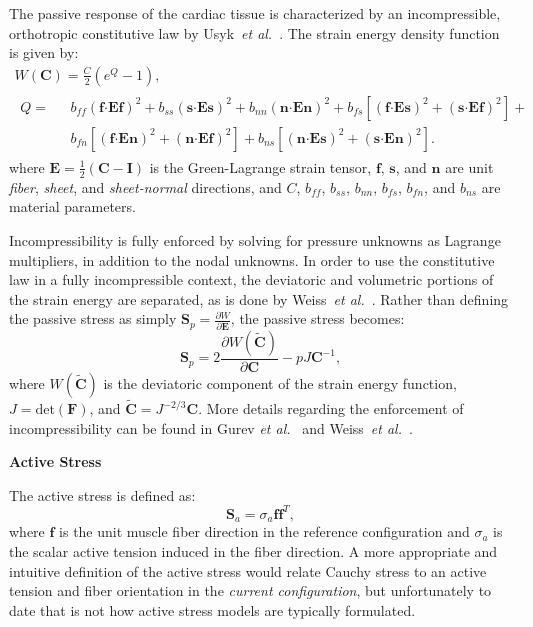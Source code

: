 The passive response of the cardiac tissue is characterized by an incompressible, orthotropic constitutive law by Usyk~\textit{et al.}~\cite{usyk_2002}. The strain energy density function is given by:
\begin{gather}
W(\bm{C}) = \frac{C}{2}\left(e^Q -1\right), \\
\begin{aligned}
Q =\text{\ } &b_{ff} \left(\bm{f}\bm{\cdot}\bm{E}\bm{f}\right)^2 + b_{ss} \left(\bm{s}\bm{\cdot}\bm{E}\bm{s}\right)^2 + b_{nn} \left(\bm{n}\bm{\cdot}\bm{E}\bm{n}\right)^2 + b_{fs}\left[\left(\bm{f}\bm{\cdot}\bm{E}\bm{s}\right)^2 + \left(\bm{s}\bm{\cdot}\bm{E}\bm{f}\right)^2\right] +\\
& b_{fn}\left[\left(\bm{f}\bm{\cdot}\bm{E}\bm{n}\right)^2 + \left(\bm{n}\bm{\cdot}\bm{E}\bm{f}\right)^2\right] + b_{ns}\left[\left(\bm{n}\bm{\cdot}\bm{E}\bm{s}\right)^2 + \left(\bm{s}\bm{\cdot}\bm{E}\bm{n}\right)^2\right].
\end{aligned}
\label{eqn:usyk}
\end{gather}
where $\bm{E} = \frac{1}{2}(\bm{C} - \bm{I})$ is the Green-Lagrange strain tensor, $\bm{f}$, $\bm{s}$, and $\bm{n}$ are unit \textit{fiber}, \textit{sheet}, and \textit{sheet-normal} directions, and $C$, $b_{ff}$, $b_{ss}$, $b_{nn}$, $b_{fs}$, $b_{fn}$, and $b_{ns}$ are material parameters.

Incompressibility is fully enforced by solving for pressure unknowns as Lagrange multipliers, in addition to the nodal unknowns. In order to use the constitutive law in a fully incompressible context, the deviatoric and volumetric portions of the strain energy are separated, as is done by Weiss~\textit{et al.}~\cite{weiss_1996}. Rather than defining the passive stress as simply $\bm{S}_p = \frac{\partial W}{\partial \bm{E}}$, the passive stress becomes:
\begin{equation}
\bm{S}_p= 2\frac{\partial{{W}(\tilde{\bm{C}})}}{\partial{\bm{C}}} - pJ\bm{C}^{-1},
\end{equation}
where ${W}(\tilde{\bm{C}})$ is the deviatoric component of the strain energy function, $J = \text{det}(\bm{F})$, and $\tilde{\bm{C}} = J^{-2/3}\bm{C}$. More details regarding the enforcement of incompressibility can be found in Gurev \textit{et al.}~\cite{gurev_2015} and Weiss~\textit{et al.}~\cite{weiss_1996}.

\textbf{Active Stress}

The active stress is defined as:
\begin{equation}
\bm{S}_a = \sigma_a \bm{f} \bm{f}^{T},
\label{eqn:active}
\end{equation}
where $\bm{f}$ is the unit muscle fiber direction in the reference configuration and ${\sigma_a}$ is the scalar active tension induced in the fiber direction. A more appropriate and intuitive definition of the active stress would relate Cauchy stress to an active tension and fiber orientation in the \textit{current configuration}, but unfortunately to date that is not how active stress models are typically formulated.

